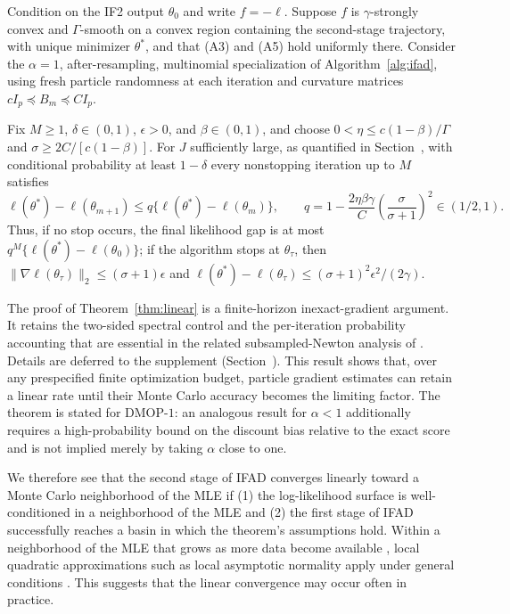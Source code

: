 \documentclass[numsec,webpdf,modern,medium,namedate]{oup-authoring-template}
\begin{document}
\begin{thm}
\label{thm:linear}\label{thm:mop-convergence}
Condition on the IF2 output $\theta_0$ and write $f=-\ell$.  Suppose $f$ is
$\gamma$-strongly convex and $\Gamma$-smooth on a convex region containing the
second-stage trajectory, with unique minimizer $\theta^*$, and that (A3) and
(A5) hold uniformly there.  Consider the $\alpha=1$, after-resampling,
multinomial specialization of Algorithm~\ref{alg:ifad}, using fresh particle
randomness at each iteration and curvature matrices
$cI_p\preceq B_m\preceq CI_p$.

Fix $M\geq1$, $\delta\in(0,1)$, $\epsilon>0$, and $\beta\in(0,1)$, and choose
$0<\eta\leq c(1-\beta)/\Gamma$ and
$\sigma\geq2C/[c(1-\beta)]$.  For $J$ sufficiently large, as quantified in
Section~\suppSecProofOptimizationConvergence, with conditional probability at
least $1-\delta$ every nonstopping iteration up to $M$ satisfies
\[
\ell(\theta^*)-\ell(\theta_{m+1})
\leq q\{\ell(\theta^*)-\ell(\theta_m)\},
\qquad
q=1-\frac{2\eta\beta\gamma}{C}
\left(\frac{\sigma}{\sigma+1}\right)^2\in(1/2,1).
\]
Thus, if no stop occurs, the final likelihood gap is at most
$q^M\{\ell(\theta^*)-\ell(\theta_0)\}$; if the algorithm stops at
$\theta_\tau$, then
$\|\nabla\ell(\theta_\tau)\|_2\leq(\sigma+1)\epsilon$ and
$\ell(\theta^*)-\ell(\theta_\tau)
\leq(\sigma+1)^2\epsilon^2/(2\gamma)$.
\end{thm}
The proof of Theorem~\ref{thm:linear} is a finite-horizon inexact-gradient
argument.  It retains the two-sided spectral control and the per-iteration
probability accounting that are essential in the related subsampled-Newton
analysis of \cite{mahoney16}.
Details are deferred to the supplement (Section~\suppSecProofOptimizationConvergence). 
This result shows that, over any prespecified finite optimization budget,
particle gradient estimates can retain a linear rate until their Monte Carlo
accuracy becomes the limiting factor.  The theorem is stated for DMOP-$1$:
an analogous result for $\alpha<1$ additionally requires a high-probability
bound on the discount bias relative to the exact score and is not implied merely
by taking $\alpha$ close to one.

We therefore see that the second stage of IFAD converges linearly toward a
Monte Carlo neighborhood of the MLE if (1) the log-likelihood surface is
well-conditioned in a neighborhood of the MLE and (2) the first stage of IFAD
successfully reaches a basin in which the theorem's assumptions hold.
Within a neighborhood of the MLE that grows as more data become available \citep{ning21}, local quadratic approximations such as local asymptotic normality apply under general conditions \citep{lecam00}.
This suggests that the linear convergence may occur often in practice.
\end{document}
